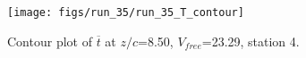 \begin{figure}[H]
\centering
\texttt{[image: figs/run\_35/run\_35\_T\_contour]}
\caption{Contour plot of $\overline{t}$ at $z/c$=8.50, $V_{free}$=23.29, station 4.}
\label{fig:run_35_T_contour}
\end{figure}


